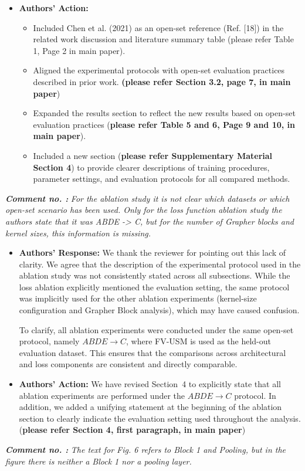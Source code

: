 \documentclass[11pt]{article}
\theoremstyle{remark}
\newcounter{mycounter} %
\newcommand\showReviewcounter{\stepcounter{mycounter}\themycounter}
\begin{document}
\begin{itemize}
	\item \textbf{Authors' Action:} 
	\begin{itemize}
		\item Included Chen et al. (2021) as an open-set reference (Ref. [18]) in the related work discussion and literature summary table (please refer Table 1, Page 2 in main paper).
		\item Aligned the experimental protocols  with open-set evaluation practices described in prior work. \textbf{(please refer Section 3.2, page 7, in main paper})
		\item Expanded the results section to reflect the new results based on open-set evaluation practices (\textbf{please refer Table 5 and 6, Page 9 and 10, in main paper}).
        \item Included a new section (\textbf{please refer Supplementary Material Section 4}) to provide clearer descriptions of training procedures, parameter settings, and evaluation protocols for all compared methods.
	\end{itemize}
\end{itemize}
\color{blue} 
\textbf{\textit{Comment no. \showReviewcounter:}} \textit{For the ablation study it is not clear which datasets or which open-set scenario has been used. Only for the loss function ablation study the authors state that it was ABDE -> C, but for the number of Grapher blocks and kernel sizes, this information is missing. }
\color{black}

\begin{itemize}
\item \textbf{Authors' Response:} 
We thank the reviewer for pointing out this lack of clarity. We agree that the description of the experimental protocol used in the ablation study was not consistently stated across all subsections. While the loss ablation explicitly mentioned the evaluation setting, the same protocol was implicitly used for the other ablation experiments (kernel-size configuration and Grapher Block analysis), which may have caused confusion.

To clarify, all ablation experiments were conducted under the same open-set protocol, namely $ABDE \rightarrow C$, where FV-USM is used as the held-out evaluation dataset. This ensures that the comparisons across architectural and loss components are consistent and directly comparable.

\item \textbf{Authors' Action:} 
We have revised Section~4 to explicitly state that all ablation experiments are performed under the $ABDE \rightarrow C$ protocol. In addition, we added a unifying statement at the beginning of the ablation section to clearly indicate the evaluation setting used throughout the analysis. (\textbf{please refer Section 4, first paragraph, in main paper})

\end{itemize}
\color{blue} 
\textbf{\textit{Comment no. \showReviewcounter:}} 
\textit{The text for Fig. 6 refers to Block 1 and Pooling, but in the figure there is neither a Block 1 nor a pooling layer.}
\color{black}
\end{document}
